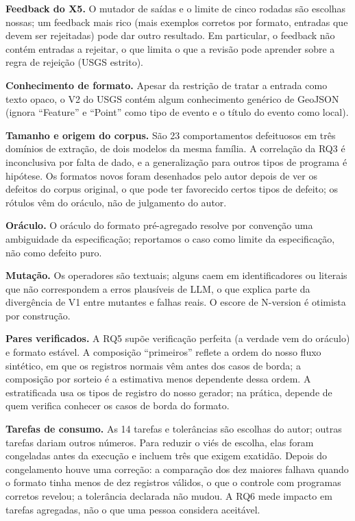 \documentclass[sigconf,nonacm]{acmart}
\begin{document}
\textbf{Feedback do X5.} O mutador de saídas e o limite de cinco rodadas são escolhas nossas; um feedback mais rico (mais exemplos corretos por formato, entradas que devem ser rejeitadas) pode dar outro resultado. Em particular, o feedback não contém entradas a rejeitar, o que limita o que a revisão pode aprender sobre a regra de rejeição (USGS estrito).

\textbf{Conhecimento de formato.} Apesar da restrição de tratar a entrada como texto opaco, o V2 do USGS contém algum conhecimento genérico de GeoJSON (ignora ``Feature'' e ``Point'' como tipo de evento e o título do evento como local).

\textbf{Tamanho e origem do corpus.} São 23 comportamentos defeituosos em três domínios de extração, de dois modelos da mesma família. A correlação da RQ3 é inconclusiva por falta de dado, e a generalização para outros tipos de programa é hipótese. Os formatos novos foram desenhados pelo autor depois de ver os defeitos do corpus original, o que pode ter favorecido certos tipos de defeito; os rótulos vêm do oráculo, não de julgamento do autor.

\textbf{Oráculo.} O oráculo do formato pré-agregado resolve por convenção uma ambiguidade da especificação; reportamos o caso como limite da especificação, não como defeito puro.

\textbf{Mutação.} Os operadores são textuais; alguns caem em identificadores ou literais que não correspondem a erros plausíveis de LLM, o que explica parte da divergência de V1 entre mutantes e falhas reais. O escore de N-version é otimista por construção.

\textbf{Pares verificados.} A RQ5 supõe verificação perfeita (a verdade vem do oráculo) e formato estável. A composição ``primeiros'' reflete a ordem do nosso fluxo sintético, em que os registros normais vêm antes dos casos de borda; a composição por sorteio é a estimativa menos dependente dessa ordem. A estratificada usa os tipos de registro do nosso gerador; na prática, depende de quem verifica conhecer os casos de borda do formato.

\textbf{Tarefas de consumo.} As 14 tarefas e tolerâncias são escolhas do autor; outras tarefas dariam outros números. Para reduzir o viés de escolha, elas foram congeladas antes da execução e incluem três que exigem exatidão. Depois do congelamento houve uma correção: a comparação dos dez maiores falhava quando o formato tinha menos de dez registros válidos, o que o controle com programas corretos revelou; a tolerância declarada não mudou. A RQ6 mede impacto em tarefas agregadas, não o que uma pessoa considera aceitável.
\end{document}
